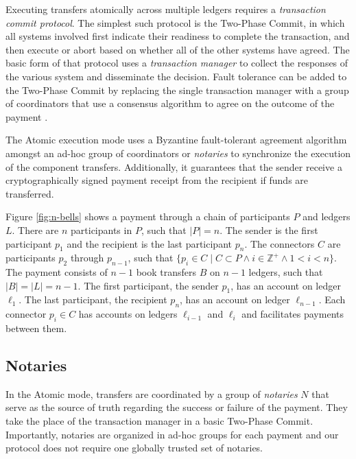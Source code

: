\documentclass[letterpaper,twocolumn,10pt]{article}
\begin{document}
Executing transfers atomically across multiple ledgers requires a \textit{transaction commit protocol}. The simplest such protocol is the Two-Phase Commit, in which all systems involved first indicate their readiness to complete the transaction, and then execute or abort based on whether all of the other systems have agreed. The basic form of that protocol uses a \textit{transaction manager} to collect the responses of the various system and disseminate the decision. Fault tolerance can be added to the Two-Phase Commit by replacing the single transaction manager with a group of coordinators that use a consensus algorithm to agree on the outcome of the payment \cite{gray2006consensus}.

The Atomic execution mode uses a Byzantine fault-tolerant agreement algorithm amongst an ad-hoc group of coordinators or \textit{notaries} to synchronize the execution of the component transfers. Additionally, it guarantees that the sender receive a cryptographically signed payment receipt from the recipient if funds are transferred.


Figure \ref{fig:n-bells} shows a payment through a chain of participants $P$ and ledgers $L$. There are $n$ participants in $P$, such that $ \left\vert{P}\right\vert = n $. The sender is the first participant $p_1$ and the recipient is the last participant $p_n$. The connectors $C$ are participants $p_2$ through $p_{n-1}$, such that $ \{ p_i \in C \mid C \subset P \land i \in \mathbb{Z}^+ \land 1 < i < n \} $. The payment consists of $n-1$ book transfers $B$ on $n-1$ ledgers, such that $\left\vert{B}\right\vert = \left\vert{L}\right\vert = n-1 $. The first participant, the sender $p_1$, has an account on ledger $\ell_1$. The last participant, the recipient $p_n$, has an account on ledger $\ell_{n-1}$. Each connector $p_i \in C$ has accounts on ledgers $\ell_{i-1}$ and $\ell_i$ and facilitates payments between them.


\subsection{Notaries}


In the Atomic mode, transfers are coordinated by a group of \textit{notaries} $N$ that serve as the source of truth regarding the success or failure of the payment. They take the place of the transaction manager in a basic Two-Phase Commit. Importantly, notaries are organized in ad-hoc groups for each payment and our protocol does not require one globally trusted set of notaries.
\end{document}
